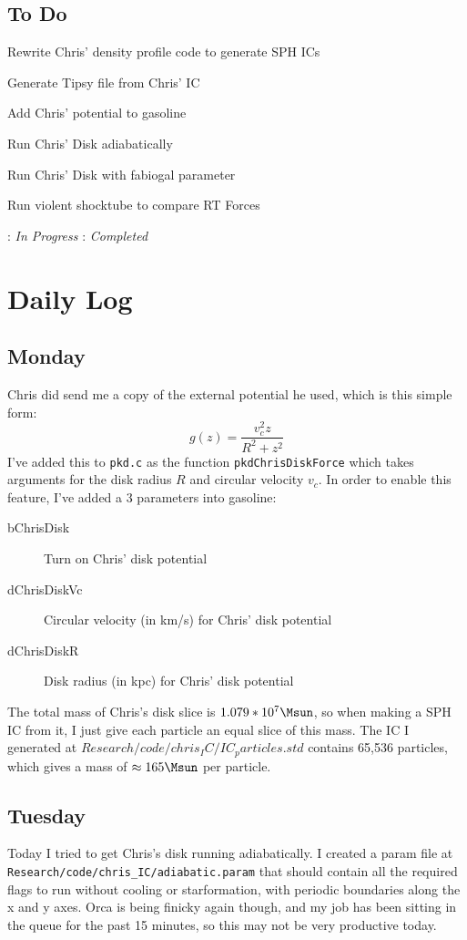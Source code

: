 \documentclass[11pt,letterpaper]{article}
\begin{document}
\pagebreak
\subsection*{To Do}
\begin{bullets}
\item[\checkmark] Rewrite Chris' density profile code to generate SPH ICs
\item[\checkmark] Generate Tipsy file from Chris' IC
\item Add Chris' potential to gasoline
\item Run Chris' Disk adiabatically
\item Run Chris' Disk with fabiogal parameter
\item Run violent shocktube to compare RT Forces
\end{bullets}

\textleaf : \textit{In Progress} \qquad \checkmark : \textit{Completed}

\section*{Daily Log}
\subsection*{Monday}
Chris did send me a copy of the external potential he used, which is this 
simple form:
$$ g(z) = \frac{v_c^2z}{R^2+z^2}$$
I've added this to \verb!pkd.c! as the function \verb!pkdChrisDiskForce!
which takes arguments for the disk radius $R$ and circular velocity $v_c$.
In order to enable this feature, I've added a 3 parameters into gasoline:
\begin{description}
\item[bChrisDisk] Turn on Chris' disk potential
\item[dChrisDiskVc] Circular velocity (in km/s) for Chris' disk potential
\item[dChrisDiskR] Disk radius (in kpc) for Chris' disk potential
\end{description}


The total mass of Chris's disk slice is $1.079*10^7\Msun$, so when making a SPH
IC from it, I just give each particle an equal slice of this mass.  The IC
I generated at $Research/code/chris_IC/IC_particles.std$ contains 65,536 
particles, which gives a mass of $\approx165\Msun$ per particle.
\subsection*{Tuesday}
Today I tried to get Chris's disk running adiabatically.  I created a param file
at \verb!Research/code/chris_IC/adiabatic.param! that should contain all the 
required flags to run without cooling or starformation, with periodic boundaries
along the x and y axes.  Orca is being finicky again though, and my job has been
sitting in the queue for the past 15 minutes, so this may not be very productive
today.
\end{document}
